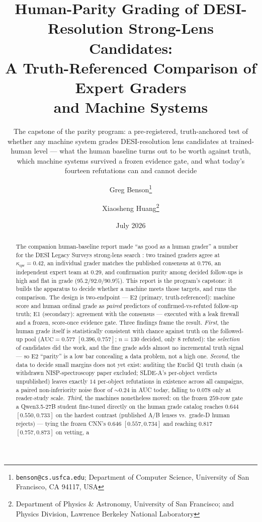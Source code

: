 \documentclass[11pt,letterpaper]{article}
\title{Human-Parity Grading of DESI-Resolution Strong-Lens Candidates:\\
       A Truth-Referenced Comparison of Expert Graders\\
       and Machine Systems}
\author{Greg Benson\thanks{\texttt{benson@cs.usfca.edu}; Department of Computer
        Science, University of San Francisco, CA 94117, USA} \and
        Xiaosheng Huang\thanks{Department of Physics \& Astronomy, University of
        San Francisco; and Physics Division, Lawrence Berkeley National Laboratory}}
\date{July 2026}
\newcommand{\qwk}{\ensuremath{\kappa_{\mathrm{qw}}}}
\begin{document}
\maketitle
\subtitle{The capstone of the parity program: a pre-registered, truth-anchored test of
whether any machine system grades DESI-resolution lens candidates at trained-human
level --- what the human baseline turns out to be worth against truth, which machine
systems survived a frozen evidence gate, and what today's fourteen refutations can and
cannot decide}

\begin{abstract}
The companion human-baseline report made ``as good as a human grader'' a number for the
DESI Legacy Surveys strong-lens search \citep{huang2020decals,huang2021desi,
storfer2024dr9,inchausti2025}: two trained graders agree at $\qwk=0.42$, an individual
grader matches the published consensus at $0.776$, an independent expert team at
$0.29$, and confirmation purity among decided follow-ups is high and flat in grade
($95.2/92.0/90.9\%$). This report is the program's capstone: it builds the apparatus to
decide whether a machine meets those targets, and runs the comparison. The design is
two-endpoint --- E2 (primary, truth-referenced): machine score and human ordinal grade
as \emph{paired} predictors of confirmed-vs-refuted follow-up truth; E1 (secondary):
agreement with the consensus --- executed with a leak firewall and a frozen,
score-once evidence gate. Three findings frame the result. \emph{First}, the human
grade itself is statistically consistent with chance against truth on the followed-up
pool ($\mathrm{AUC}=0.577$ $[0.396,0.757]$; $n=130$ decided, only $8$ refuted): the
\emph{selection} of candidates did the work, and the fine grade adds almost no
incremental truth signal --- so E2 ``parity'' is a low bar concealing a data problem,
not a high one. \emph{Second}, the data to decide small margins does not yet exist:
auditing the Euclid Q1 truth chain (a withdrawn NISP-spectroscopy paper excluded;
SLDE-A's per-object verdicts unpublished) leaves exactly $14$ per-object refutations in
existence across all campaigns, a paired non-inferiority noise floor of ${\sim}0.24$ in
AUC today, falling to $0.078$ only at reader-study scale. \emph{Third}, the machines
nonetheless moved: on the frozen $259$-row gate a Qwen3.5-27B student fine-tuned
directly on the human grade catalog reaches $0.644$ $[0.550,0.733]$ on the hardest
contrast (published A/B lenses vs.\ grade-D human rejects) --- tying the frozen CNN's
$0.646$ $[0.557,0.734]$ and reaching $0.817$ $[0.757,0.873]$ on vetting, a

\end{abstract}
\end{document}

